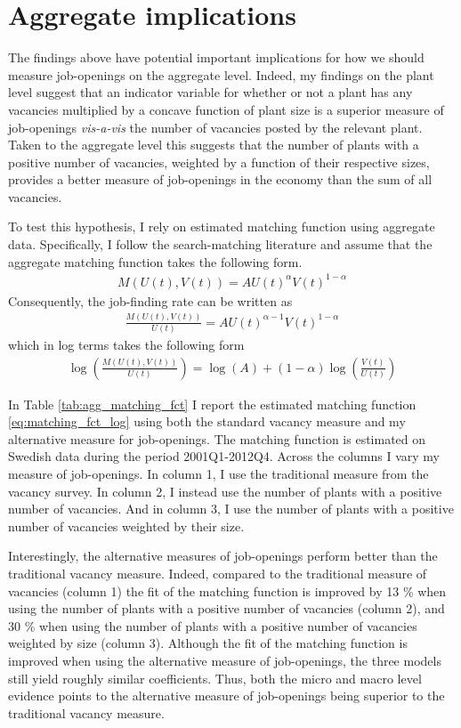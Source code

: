 \section{Aggregate implications}
\label{sec:agg_implications}

The findings above have potential important implications for how we should measure job-openings on the aggregate level. Indeed, my findings on the plant level suggest that an indicator variable for whether or not a plant has any vacancies multiplied by a concave function of plant size is a superior measure of job-openings \emph{vis-a-vis} the number of vacancies posted by the relevant plant. Taken to the aggregate level this suggests that the number of plants with a positive number of vacancies, weighted by a function of their respective sizes, provides a better measure of job-openings in the economy than the sum of all vacancies. 

To test this hypothesis, I rely on estimated matching function using aggregate data. Specifically, I follow the search-matching literature and assume that the aggregate matching function takes the following form. 
\begin{align}
M(U(t), V(t))=AU(t)^{\alpha}V(t)^{1-\alpha}
\end{align}
Consequently, the job-finding rate can be written as
\begin{align}
\frac{M(U(t), V(t))}{U(t)}=AU(t)^{\alpha-1} V(t)^{1-\alpha}
\end{align}
which in log terms takes the following form
\begin{align}
\log\left(\frac{M(U(t), V(t))}{U(t)}\right) =\log(A)+\left(1-\alpha\right)\log\left(\frac{V(t)}{U(t)}\right) \label{eq:matching_fct_log}
\end{align}

In Table \ref{tab:agg_matching_fct} I report the estimated matching function \eqref{eq:matching_fct_log} using both the standard vacancy measure and my alternative measure for job-openings.  The matching function is estimated on Swedish data during the period 2001Q1-2012Q4. Across the columns I vary my measure of job-openings. In column 1, I use the traditional measure from the vacancy survey. In column 2, I instead use the number of plants with a positive number of vacancies. And in column 3, I use the number of plants with a positive number of vacancies weighted by their size. 

Interestingly, the alternative measures of job-openings perform better than the traditional vacancy measure. Indeed, compared to the traditional measure of vacancies (column 1) the fit of the matching function is improved by 13 \% when using the number of plants with a positive number of vacancies (column 2), and 30 \% when using the number of plants with a positive number of vacancies weighted by size (column 3). Although the fit of the matching function is improved when using the alternative measure of job-openings, the three models still yield roughly similar coefficients. Thus, both the micro and macro level evidence points to the alternative measure of job-openings being superior to the traditional vacancy measure. 

